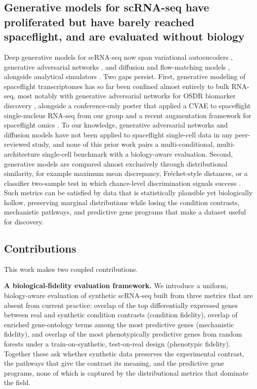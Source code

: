 \documentclass[11pt]{article}
\begin{document}
\subsection{Generative models for scRNA-seq have proliferated but have barely reached spaceflight, and are evaluated without biology}
Deep generative models for scRNA-seq now span variational autoencoders \cite{scvi,activa}, generative adversarial networks \cite{scgan}, and diffusion and flow-matching models \cite{scdiffusion,cfdiffusion,cfgen}, alongside analytical simulators \cite{scgft,scdesign3,simbench}. Two gaps persist. First, generative modeling of spaceflight transcriptomes has so far been confined almost entirely to bulk RNA-seq, most notably with generative adversarial networks for OSDR biomarker discovery \cite{ganbio}, alongside a conference-only poster that applied a CVAE to spaceflight single-nucleus RNA-seq from our group \cite{ntrs} and a recent augmentation framework for spaceflight omics \cite{glare}. To our knowledge, generative adversarial networks and diffusion models have not been applied to spaceflight single-cell data in any peer-reviewed study, and none of this prior work pairs a multi-conditional, multi-architecture single-cell benchmark with a biology-aware evaluation. Second, generative models are compared almost exclusively through distributional similarity, for example maximum mean discrepancy, Fr\'echet-style distances, or a classifier two-sample test in which chance-level discrimination signals success \cite{scgan,scdiffusion}. Such metrics can be satisfied by data that is statistically plausible yet biologically hollow, preserving marginal distributions while losing the condition contrasts, mechanistic pathways, and predictive gene programs that make a dataset useful for discovery.

\subsection{Contributions}
This work makes two coupled contributions.

\noindent\textbf{A biological-fidelity evaluation framework.} We introduce a uniform, biology-aware evaluation of synthetic scRNA-seq built from three metrics that are absent from current practice: overlap of the top differentially expressed genes between real and synthetic condition contrasts (condition fidelity), overlap of enriched gene-ontology terms among the most predictive genes (mechanistic fidelity), and overlap of the most phenotypically predictive genes from random forests under a train-on-synthetic, test-on-real design (phenotypic fidelity). Together these ask whether synthetic data preserves the experimental contrast, the pathways that give the contrast its meaning, and the predictive gene programs, none of which is captured by the distributional metrics that dominate the field.
\end{document}
